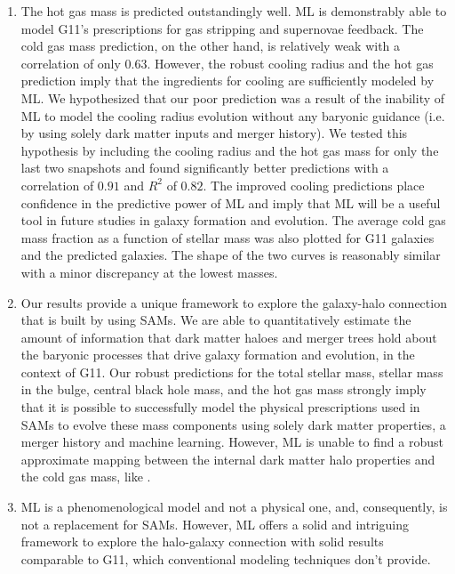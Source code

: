 \documentclass[a4paper,fleqn,usenatbib]{mnras}
\begin{document}
\begin{enumerate}
 \item The hot gas mass is predicted outstandingly well. ML is demonstrably able to model G11's prescriptions for gas stripping and supernovae feedback. The cold gas mass prediction, on the other hand, is relatively weak with a correlation of only $0.63$. However, the robust cooling radius and the hot gas prediction imply that the ingredients for cooling are sufficiently modeled by ML. We hypothesized that our poor prediction was a result of the inability of ML to model the cooling radius evolution without any baryonic guidance (i.e. by using solely dark matter inputs and merger history). We tested this hypothesis by including the cooling radius and the hot gas mass for only the last two snapshots and found significantly better predictions with a correlation of $0.91$ and $R^2$ of $0.82$. The improved cooling predictions place confidence in the predictive power of ML and imply that ML will be a useful tool in future studies in galaxy formation and evolution. The average cold gas mass fraction as a function of stellar mass was also plotted for G11 galaxies and the predicted galaxies. The shape of the two curves is reasonably similar with a minor discrepancy at the lowest masses. 
 
 \item Our results provide a unique framework to explore the galaxy-halo connection that is built by using SAMs. We are able to quantitatively estimate the amount of information that dark matter haloes and merger trees hold about the baryonic processes that drive galaxy formation and evolution, in the context of G11. Our robust predictions for the total stellar mass, stellar mass in the bulge, central black hole mass, and the hot gas mass strongly imply that it is possible to successfully model the physical prescriptions used in SAMs to evolve these mass components using solely dark matter properties, a merger history and machine learning. However, ML is unable to find a robust approximate mapping between the internal dark matter halo properties and the cold gas mass, like \citet{neistein2010degeneracy, faucher2011baryonic, contreras2015galaxy}. 
 
 \item ML is a phenomenological model and not a physical one, and, consequently, is not a replacement for SAMs. However, ML offers a solid and intriguing framework to explore the halo-galaxy connection with solid results comparable to G11, which conventional modeling techniques don't provide. 
\end{enumerate}
\end{document}

